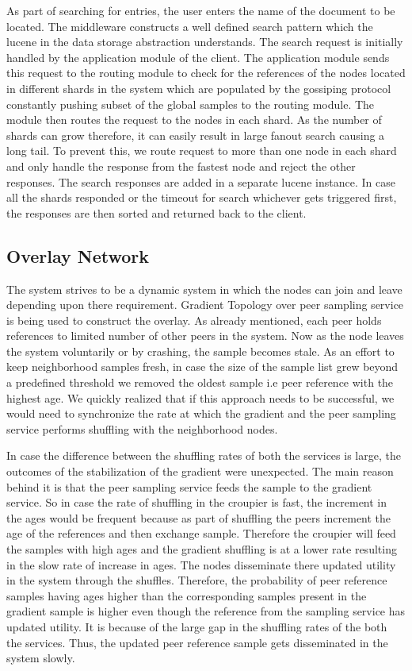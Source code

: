 \documentclass[12pt,a4paper,twoside,openright]{book}
\begin{document}
\par As part of searching for entries, the user enters the name of the document to be located. The middleware constructs a well defined search pattern which the lucene in the data storage abstraction understands. The search request is initially handled by the application module of the client. The application module sends this request to the routing module to check for the references of the nodes located in different shards in the system which are populated by the gossiping protocol constantly pushing subset of the global samples to the routing module. The module then routes the request to the nodes in each shard. As the number of shards can grow therefore, it can easily result in large fanout search causing a long tail. To prevent this, we route request to more than one node in each shard and only handle the response from the fastest node and reject the other responses. The search responses are added in a separate lucene instance. In case all the shards responded or the timeout for search whichever gets triggered first, the responses are then sorted and returned back to the client. 

\subsection{Overlay Network}
The system strives to be a dynamic system in which the nodes can join and leave depending upon there requirement. Gradient Topology over peer sampling service is being used to construct the overlay. As already mentioned, each peer holds references to limited number of other peers in the system. Now as the node leaves the system voluntarily or by crashing, the sample becomes stale. As an effort to keep neighborhood samples fresh, in case the size of the sample list grew beyond a predefined threshold we removed the oldest sample i.e peer reference with the highest age. We quickly realized that if this approach needs to be successful, we would need to synchronize the rate at which the gradient and the peer sampling service performs shuffling with the neighborhood nodes.
\par In case the difference between the shuffling rates of both the services is large, the outcomes of the stabilization of the gradient were unexpected. The main reason behind it is that the peer sampling service feeds the sample to the gradient service. So in case the rate of shuffling in the croupier is fast, the increment in the ages would be frequent because as part of shuffling the peers increment the age of the references and then exchange sample. Therefore the croupier will feed the samples with high ages and the gradient shuffling is at a lower rate resulting in the slow rate of increase in ages. The nodes disseminate there updated utility in the system through the shuffles. Therefore, the probability of peer reference samples having ages higher than the corresponding samples present in the gradient sample is higher even though the reference from the sampling service has updated utility. It is because of the large gap in the shuffling rates of the both the services. Thus, the updated peer reference sample gets disseminated in the system slowly.
\end{document}
